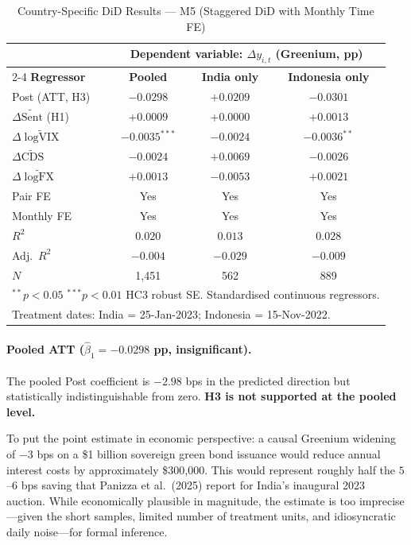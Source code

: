 \documentclass[12pt,a4paper]{article}
\begin{document}
\begin{table}[H]
\centering
\caption{Country-Specific DiD Results --- M5 (Staggered DiD with Monthly Time FE)}
\label{tab:country_did}
\small
\setlength{\tabcolsep}{7pt}
\begin{tabular}{lccc}
\toprule
 & \multicolumn{3}{c}{\textbf{Dependent variable: $\Delta y_{i,t}$ (Greenium, pp)}} \\
\cmidrule(lr){2-4}
\textbf{Regressor} & \textbf{Pooled} & \textbf{India only} & \textbf{Indonesia only} \\
\midrule
Post (ATT, H3)             & $-0.0298$ & $+0.0209$ & $-0.0301$ \\
$\Delta\widetilde{\text{Sent}}$ (H1) & $+0.0009$ & $+0.0000$ & $+0.0013$ \\
$\Delta\widetilde{\log\text{VIX}}$   & $-0.0035^{***}$ & $-0.0024$ & $-0.0036^{**}$ \\
$\Delta\widetilde{\text{CDS}}$       & $-0.0024$ & $+0.0069$ & $-0.0026$ \\
$\Delta\widetilde{\log\text{FX}}$    & $+0.0013$ & $-0.0053$ & $+0.0021$ \\
\midrule
Pair FE     & Yes & Yes & Yes \\
Monthly FE  & Yes & Yes & Yes \\
\midrule
$R^2$       & $0.020$ & $0.013$ & $0.028$ \\
Adj.\ $R^2$ & $-0.004$ & $-0.029$ & $-0.009$ \\
$N$         & 1,451 & 562 & 889 \\
\midrule
\multicolumn{4}{l}{\footnotesize $^{**}p<0.05$ \quad $^{***}p<0.01$ \quad HC3 robust SE. Standardised continuous regressors.} \\
\multicolumn{4}{l}{\footnotesize Treatment dates: India = 25-Jan-2023; Indonesia = 15-Nov-2022.}\\
\bottomrule
\end{tabular}
\end{table}

\paragraph{Pooled ATT ($\hat{\beta}_1 = -0.0298$ pp, insignificant).}

The pooled Post coefficient is $-2.98$ bps in the predicted direction but statistically indistinguishable from zero. \textbf{H3 is not supported at the pooled level.}

To put the point estimate in economic perspective: a causal Greenium widening of $-3$ bps on a \$1 billion sovereign green bond issuance would reduce annual interest costs by approximately \$300,000. This would represent roughly half the $5$--$6$ bps saving that Panizza et al.\ (2025) report for India's inaugural 2023 auction. While economically plausible in magnitude, the estimate is too imprecise---given the short samples, limited number of treatment units, and idiosyncratic daily noise---for formal inference.
\end{document}
